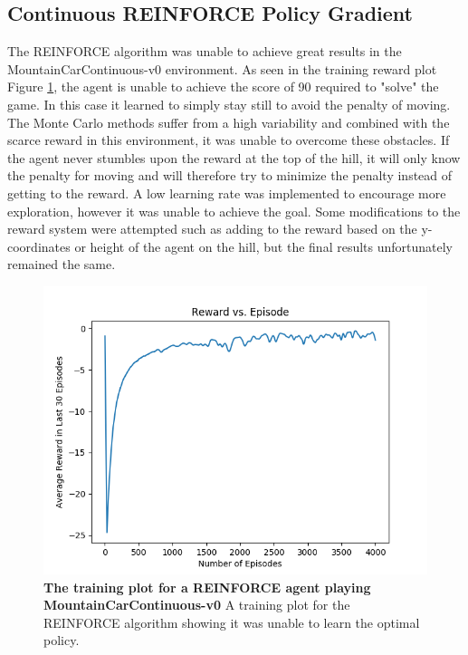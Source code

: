 \documentclass[conference]{IEEEtran}
\begin{document}
\subsection{Continuous REINFORCE Policy Gradient}
The REINFORCE algorithm was unable to achieve great results in the MountainCarContinuous-v0 environment. As seen in the training reward plot Figure \ref{fig:REINFORCEMccTrain}, the agent is unable to achieve the score of 90 required to "solve" the game. In this case it learned to simply stay still to avoid the penalty of moving. The Monte Carlo methods suffer from a high variability and combined with the scarce reward in this environment, it was unable to overcome these obstacles. If the agent never stumbles upon the reward at the top of the hill, it will only know the penalty for moving and will therefore try to minimize the penalty instead of getting to the reward. A low learning rate was implemented to encourage more exploration, however it was unable to achieve the goal. 
Some modifications to the reward system were attempted such as adding to the reward based on the y-coordinates or height of the agent on the hill, but the final results unfortunately	remained the same. 

\begin{figure}[htbp]
\centerline{\includegraphics[scale=0.5]{REINFORCEMccTrain.png}}
\caption{\textbf{The training plot for a REINFORCE agent playing MountainCarContinuous-v0}  A training plot for the REINFORCE algorithm showing it was unable to learn the optimal policy.}
\label{fig:REINFORCEMccTrain}
\end{figure}
\end{document}
